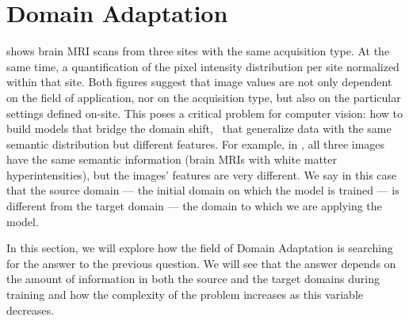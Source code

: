 
\section{Domain Adaptation}\label{sec:domain_adaptation}


 shows brain MRI scans from three sites with the same acquisition type. At the same time,   a quantification of the pixel intensity distribution per site normalized within that site. Both figures suggest that image values are not only dependent on the field of application, nor on the acquisition type, but also on the particular settings defined on-site. This poses a critical problem for computer vision: how to build models that bridge the domain shift, \ie~that generalize data with the same semantic distribution but different features. For example, in , all three images have the same semantic information (brain MRIs with white matter hyperintensities), but the images' features are very different. We say in this case that the source domain --- the initial domain on which the model is trained --- is different from the target domain --- the domain to which we are applying the model.


In this section, we will explore how the field of Domain Adaptation is searching for the answer to the previous question. We will see that the answer depends on the amount of information in both the source and the target domains during training and how the complexity of the problem increases as this variable decreases.

